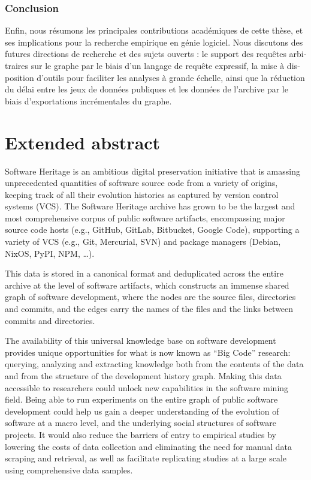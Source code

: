\begin{otherlanguage}{french}
\subsection*{Conclusion}

Enfin, nous résumons les principales contributions académiques de cette thèse,
et ses implications pour la recherche empirique en génie logiciel. Nous
discutons des futures directions de recherche et des sujets ouverts : le
support des requêtes arbitraires sur le graphe par le biais d'un langage de
requête expressif, la mise à disposition d'outils pour faciliter les analyses à
grande échelle, ainsi que la réduction du délai entre les jeux de données
publiques et les données de l'archive par le biais d'exportations incrémentales
du graphe.

\end{otherlanguage}


\chapter*{Extended abstract}

Software Heritage is an ambitious digital preservation initiative that is
amassing unprecedented quantities of software source code from a variety of
origins, keeping track of all their evolution histories as captured by version
control systems (VCS). The Software Heritage archive has grown to be the
largest and most comprehensive corpus of public software artifacts,
encompassing major source code hosts (e.g., GitHub, GitLab, Bitbucket,
Google Code), supporting a variety of VCS (e.g., Git, Mercurial, SVN) and
package managers (Debian, NixOS, PyPI, NPM, …).

This data is stored in a canonical format and deduplicated across the entire
archive at the level of software artifacts, which constructs an immense shared
graph of software development, where the nodes are the source files,
directories and commits, and the edges carry the names of the files and the
links between commits and directories.

The availability of this universal knowledge base on software development
provides unique opportunities for what is now known as “Big Code” research:
querying, analyzing and extracting knowledge both from the contents of the data
and from the structure of the development history graph.
Making this data accessible to researchers could unlock new capabilities in the
software mining field. Being able to run experiments on the entire graph of
public software development could help us gain a deeper understanding of the
evolution of software at a macro level, and the underlying social structures of
software projects. It would also reduce the barriers of entry to empirical
studies by lowering the costs of data collection and eliminating the need for
manual data scraping and retrieval, as well as facilitate replicating studies
at a large scale using comprehensive data samples.


